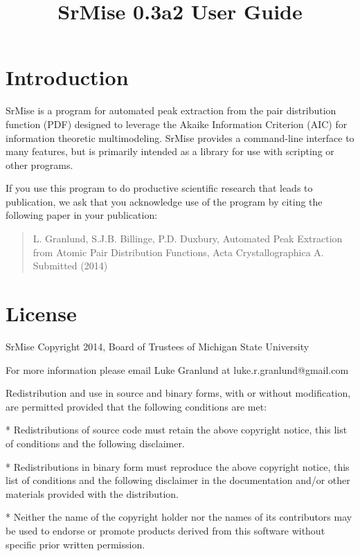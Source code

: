 \documentclass[12pt]{article}
\begin{document}
\raggedright

\title{{\sc SrMise} 0.3a2 User Guide}
\maketitle


\section{Introduction}
{\sc SrMise} is a program for automated peak extraction from the pair distribution function (PDF) designed to leverage the Akaike Information Criterion (AIC) for information theoretic multimodeling.  {\sc SrMise} provides a command-line interface to many features, but is primarily intended as a library for use with scripting or other programs.

If you use this program to do productive scientific research that
leads to publication, we ask that you acknowledge use of the
program by citing the following paper in your publication:

\begin{quote}
    L. Granlund, S.J.B. Billinge, P.D. Duxbury, Automated Peak
    Extraction from Atomic Pair Distribution Functions, Acta
    Crystallographica A.  Submitted (2014)
\end{quote}

\section{License}


SrMise Copyright 2014, Board of Trustees of Michigan State University

For more information please email Luke Granlund at
    luke.r.granlund@gmail.com

Redistribution and use in source and binary forms, with or without
modification, are permitted provided that the following conditions
are met:

  * Redistributions of source code must retain the above copyright
    notice, this list of conditions and the following disclaimer.

  * Redistributions in binary form must reproduce the above copyright
    notice, this list of conditions and the following disclaimer in the
    documentation and/or other materials provided with the distribution.

  * Neither the name of the copyright holder nor the names of its
    contributors may be used to endorse or promote products derived from
    this software without specific prior written permission.
\end{document}
